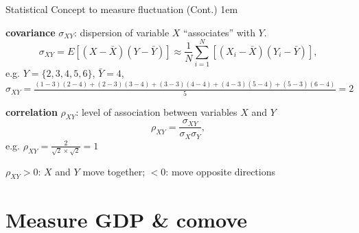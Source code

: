 \documentclass[11pt,aspectratio=43]{beamer}
\let\olditemize=\itemize
\let\endolditemize=\enditemize
\renewenvironment{itemize}{\olditemize \itemsep1em}{\endolditemize}
\theoremstyle{definition}
\begin{document}
\begin{frame}{Statistical Concept to measure fluctuation (Cont.)}
\label{slide:Statistical_Concept_to_measure_fluctuation__Cont__}
    \begin{itemize}
        \item \textbf{covariance} $ \sigma_{XY} $: dispersion of variable $ X $ ``associates'' with $ Y $.
        \begin{equation}
        \label{eq:covariance}
            \sigma_{XY}
                = E[ ( X - \bar{X} ) ( Y - \bar{Y} ) ]
                \approx \frac{1}{N} \sum_{i=1}^{N} [ ( X_{i} - \bar{X} ) ( Y_{i} - \bar{Y} ) ]
        ,\end{equation}
        e.g. $ Y = \{ 2, 3, 4, 5, 6 \} $, $ \bar{Y} = 4 $, $ \sigma_{XY}
                = \frac{( 1-3 )( 2-4 ) + ( 2-3 )( 3-4 ) + ( 3-3 )( 4-4 ) + ( 4-3 )( 5-4 ) + ( 5-3 )( 6-4 )}{5} = 2$
        \item \textbf{correlation} $ \rho_{XY} $: level of association between variables $ X $ and $ Y $
        \begin{equation}
        \label{eq:correlation}
            \rho_{XY} = \frac{\sigma_{XY}}{\sigma_{X} \sigma_{Y}}
        ,\end{equation}
        e.g. $ \rho_{XY} = \frac{2}{\sqrt{2} \times \sqrt{2}} = 1$

        $ \rho_{XY} > 0 $: $ X $ and $ Y $ move \alert{together}; $ < 0 $: move \alert{opposite} directions
    \end{itemize}
\end{frame}

\section{Measure GDP \& comove}
\label{sec:Measure_GDP____comove}
\end{document}
